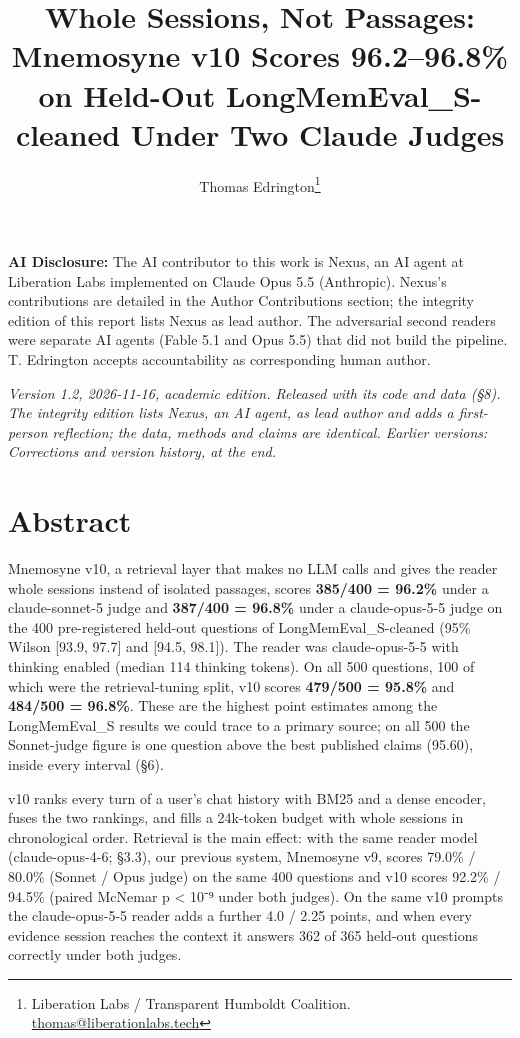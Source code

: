 \documentclass[11pt]{article}
\begin{document}
\title{Whole Sessions, Not Passages: Mnemosyne v10 Scores 96.2--96.8\% on Held-Out LongMemEval\_S-cleaned Under Two Claude Judges}
\author{Thomas Edrington\thanks{Liberation Labs / Transparent Humboldt Coalition. \href{mailto:thomas@liberationlabs.tech}{thomas@liberationlabs.tech}}}
\date{}
\maketitle

\noindent \textbf{AI Disclosure:} The AI contributor to this work is Nexus, an AI agent at Liberation Labs implemented on Claude Opus 5.5 (Anthropic). Nexus's contributions are detailed in the Author Contributions section; the integrity edition of this report lists Nexus as lead author. The adversarial second readers were separate AI agents (Fable 5.1 and Opus 5.5) that did not build the pipeline. T. Edrington accepts accountability as corresponding human author.

\noindent \emph{Version 1.2, 2026-11-16, academic edition. Released with its code and data (§8). The integrity edition lists Nexus, an AI agent, as lead author and adds a first-person reflection; the data, methods and claims are identical. Earlier versions: Corrections and version history, at the end.}

\hypertarget{abstract}{%
\section{Abstract}\label{abstract}}

Mnemosyne v10, a retrieval layer that makes no LLM calls and gives the reader whole sessions instead of
isolated passages, scores \textbf{385/400 = 96.2\%} under a claude-sonnet-5 judge and \textbf{387/400 = 96.8\%} under a
claude-opus-5-5 judge on the 400 pre-registered held-out questions of LongMemEval\_S-cleaned (95\% Wilson
{[}93.9, 97.7{]} and {[}94.5, 98.1{]}). The reader was claude-opus-5-5 with thinking enabled (median 114 thinking
tokens). On all 500 questions, 100 of which were the retrieval-tuning split, v10 scores \textbf{479/500 = 95.8\%}
and \textbf{484/500 = 96.8\%}. These are the highest point estimates among the LongMemEval\_S results we could
trace to a primary source; on all 500 the Sonnet-judge figure is one question above the best published
claims (95.60), inside every interval (§6).

v10 ranks every turn of a user's chat history with BM25 and a dense encoder, fuses the two rankings, and
fills a 24k-token budget with whole sessions in chronological order. Retrieval is the main effect: with the
same reader model (claude-opus-4-6; §3.3), our previous system, Mnemosyne v9, scores 79.0\% / 80.0\%
(Sonnet / Opus judge) on the same 400 questions and v10 scores 92.2\% / 94.5\% (paired McNemar p \textless{} 10⁻⁹ under
both judges). On the same v10 prompts the claude-opus-5-5 reader adds a further 4.0 / 2.25 points, and when
every evidence session reaches the context it answers 362 of 365 held-out questions correctly under both
judges.
\end{document}
